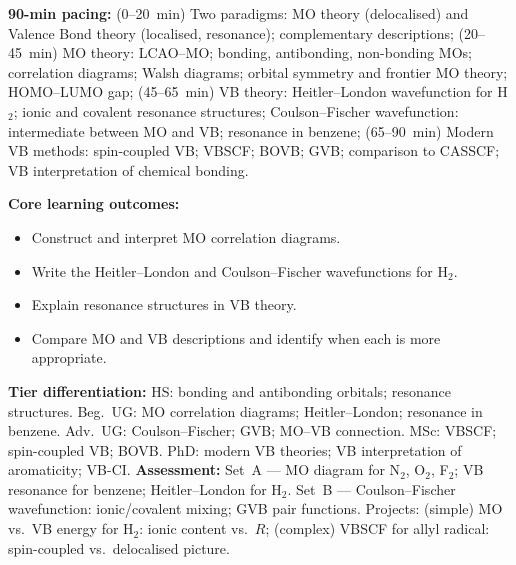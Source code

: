 \documentclass[11pt,a4paper]{article}
\begin{document}
\medskip

\begin{tcolorbox}[chembox, title={Module~III.2 --- Lecture L11: Orbital Theories and Bonding Models}]
\textbf{90-min pacing:} (0--20~min) Two paradigms: MO theory (delocalised) and Valence Bond theory (localised, resonance); complementary descriptions; (20--45~min) MO theory: LCAO--MO; bonding, antibonding, non-bonding MOs; correlation diagrams; Walsh diagrams; orbital symmetry and frontier MO theory; HOMO--LUMO gap; (45--65~min) VB theory: Heitler--London wavefunction for H$_2$; ionic and covalent resonance structures; Coulson--Fischer wavefunction: intermediate between MO and VB; resonance in benzene; (65--90~min) Modern VB methods: spin-coupled VB; VBSCF; BOVB; GVB; comparison to CASSCF; VB interpretation of chemical bonding.

\medskip\textbf{Core learning outcomes:}
\begin{itemize}[leftmargin=1.4em,topsep=2pt,itemsep=1pt]
  \item Construct and interpret MO correlation diagrams.
  \item Write the Heitler--London and Coulson--Fischer wavefunctions for H$_2$.
  \item Explain resonance structures in VB theory.
  \item Compare MO and VB descriptions and identify when each is more appropriate.
\end{itemize}
\medskip\textbf{Tier differentiation:}
HS: bonding and antibonding orbitals; resonance structures.
Beg.\ UG: MO correlation diagrams; Heitler--London; resonance in benzene.
Adv.\ UG: Coulson--Fischer; GVB; MO--VB connection.
MSc: VBSCF; spin-coupled VB; BOVB.
PhD: modern VB theories; VB interpretation of aromaticity; VB-CI.
\medskip\textbf{Assessment:}
Set~A --- MO diagram for N$_2$, O$_2$, F$_2$; VB resonance for benzene; Heitler--London for H$_2$.
Set~B --- Coulson--Fischer wavefunction: ionic/covalent mixing; GVB pair functions.
Projects: (simple) MO vs.\ VB energy for H$_2$: ionic content vs.\ $R$; (complex) VBSCF for allyl radical: spin-coupled vs.\ delocalised picture.
\end{tcolorbox}

\medskip
\end{document}
